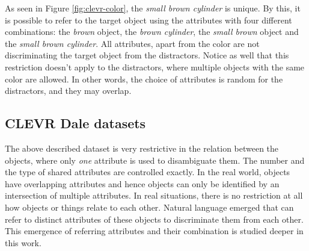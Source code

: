 As seen in Figure \ref{fig:clevr-color}, the \emph{small brown cylinder} is unique.
By this, it is possible to refer to the target object using the attributes with four different combinations: the \emph{brown} object, the \emph{brown cylinder}, the \emph{small brown} object and the \emph{small brown cylinder}.
All attributes, apart from the color are not discriminating the target object from the distractors.
Notice as well that this restriction doesn't apply to the distractors, where multiple objects with the same color are allowed.
In other words, the choice of attributes is random for the distractors, and they may overlap.

\subsection{CLEVR Dale datasets}
The above described dataset is very restrictive in the relation between the objects, where only \emph{one} attribute is used to disambiguate them.
The number and the type of shared attributes are controlled exactly.
In the real world, objects have overlapping attributes and hence objects can only be identified by an intersection of multiple attributes.
In real situations, there is no restriction at all how objects or things relate to each other.
Natural language emerged that can refer to distinct attributes of these objects to discriminate them from each other.
This emergence of referring attributes and their combination is studied deeper in this work.

